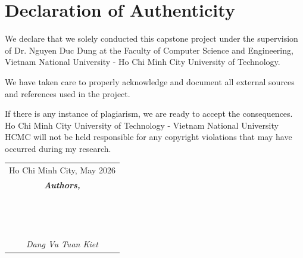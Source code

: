 \chapter*{Declaration of Authenticity}

We declare that we solely conducted this capstone project under the supervision of Dr. Nguyen Duc Dung at the Faculty of Computer Science and Engineering, Vietnam National University - Ho Chi Minh City University of Technology.
 
\noindent We have taken care to properly acknowledge and document all external sources and references used in the project.
 
\noindent If there is any instance of plagiarism, we are ready to accept the consequences. Ho Chi Minh City University of Technology - Vietnam National University HCMC will not be held responsible for any copyright violations that may have occurred during my research.

\vspace{2cm}

\begin{flushright}
\begin{tabular}{c}
    Ho Chi Minh City, May 2026 \\
    \textit{\textbf{Authors,}}\\~\\~\\~\\
    \textit{Dang Vu Tuan Kiet}
    
\end{tabular}
\end{flushright}